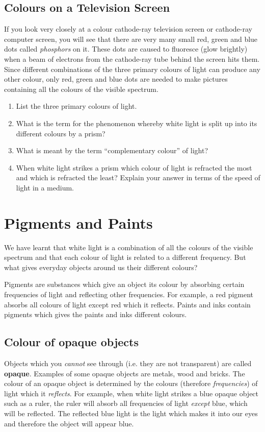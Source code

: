 \subsection{Colours on a Television Screen}
If you look very closely at a colour cathode-ray television screen or cathode-ray computer screen, you will see that there are very many small red, green and blue dots called \textit{phosphors} on it. These dots are caused to fluoresce (glow brightly) when a beam of electrons from the cathode-ray tube behind the screen hits them. Since different combinations of the three primary colours of light can produce any other colour, only red, green and blue dots are needed to make pictures containing all the colours of the visible spectrum.

{
\begin{enumerate}
\item List the three primary colours of light.
\item What is the term for the phenomenon whereby white light is split up into its different colours by a prism?
\item What is meant by the term ``complementary colour'' of light?
\item When white light strikes a prism which colour of light is refracted the most and which is refracted the least? Explain your answer in terms of the speed of light in a medium.
\end{enumerate}
}


\section{Pigments and Paints}

We have learnt that white light is a combination of all the colours of the visible spectrum and that each colour of light is related to a different frequency. But what gives everyday objects around us their different colours? 

Pigments are substances which give an object its colour by absorbing certain frequencies of light and reflecting other frequencies. For example, a red pigment absorbs all colours of light except red which it reflects. Paints and inks contain pigments which gives the paints and inks different colours. 


\subsection{Colour of opaque objects}
Objects which you \textit{cannot} see through (i.e. they are not transparent) are called \textbf{opaque}. Examples of some opaque objects are metals, wood and bricks. The colour of an opaque object is determined by the colours (therefore \textit{frequencies}) of light which it \textit{reflects}. For example, when white light strikes a blue opaque object such as a ruler, the ruler will absorb all frequencies of light \textit{except} blue, which will be reflected. The reflected blue light is the light which makes it into our eyes and therefore the object will appear blue.

